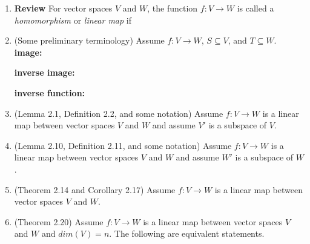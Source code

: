 \documentclass[11pt,fleqn]{article}
\begin{document}
\renewcommand{\headrulewidth}{0pt}
\newcommand{\blank}[1]{\rule{#1}{0.75pt}}
\renewcommand{\d}{\displaystyle}

\newcommand{\bpm}{\begin{pmatrix}}
\newcommand{\epm}{\end{pmatrix}}
\newcommand{\bbm}{\begin{bmatrix}}
\newcommand{\ebm}{\end{bmatrix}}

\vspace*{-0.7in}

\begin{center}
  \large {}
\end{center}
\begin{enumerate}
\item \textbf{Review} For vector spaces $V$ and $W$, the function $f:V \to W$ is called a \emph{homomorphism} or \emph{linear map} if
\vspace{0.5in}

\item (Some preliminary terminology) Assume $f:V \to W$, $S \subseteq V$, and $T \subseteq W.$ \\

\textbf{image:}\\

\vspace{0.25in}

\textbf{inverse image:}\\

\vspace{0.25in}

\textbf{inverse function:}\\

\vspace{0.25in}

\item (Lemma 2.1, Definition 2.2, and some notation) Assume $f:V \to W$ is a linear map between vector spaces $V$ and $W$ and assume $V'$ is a subspace of $V$.  
\vfill
\newpage
\item (Lemma 2.10, Definition 2.11, and some notation) Assume $f:V \to W$ is a linear map between vector spaces $V$ and $W$ and assume $W'$ is a subspace of $W$.  
\vfill
\item (Theorem 2.14 and Corollary 2.17) Assume $f:V \to W$ is a linear map between vector spaces $V$ and $W.$
\vfill
\item (Theorem 2.20) Assume $f:V \to W$ is a linear map between vector spaces $V$ and $W$ and $dim(V)=n.$ The following are equivalent statements.
\vfill
\end{enumerate}
\end{document}
